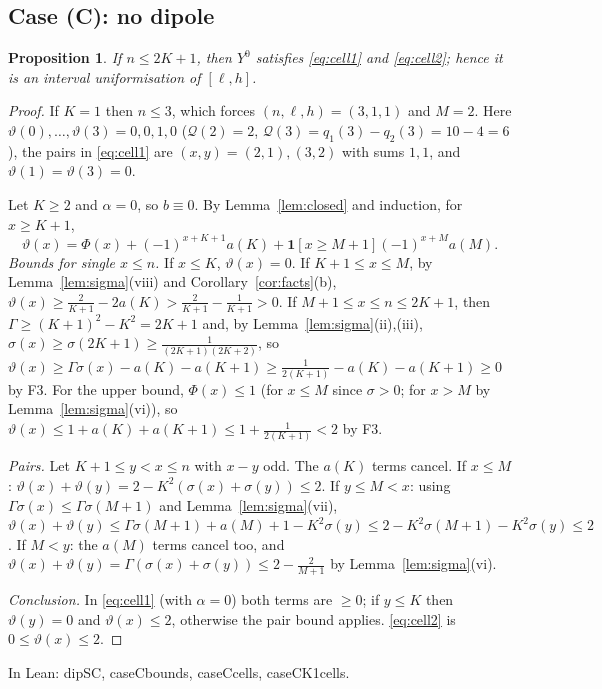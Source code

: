 \documentclass[11pt]{amsart}
\newtheorem{proposition}[lemma]{Proposition}
\theoremstyle{definition}
\theoremstyle{remark}
\numberwithin{equation}{section}
\newcommand{\ind}[1]{\mathbf{1}[#1]}
\newcommand{\cQ}{\mathcal{Q}}
\newcommand{\leanus}{\textunderscore\allowbreak}
\newcommand{\lean}[1]{{\ttfamily\let\_\leanus #1}}
\begin{document}
\subsection{Case (C): no dipole}

\begin{proposition}\label{prop:caseC}
If $n\le2K+1$, then $Y^0$ satisfies \eqref{eq:cell1} and \eqref{eq:cell2}; hence it is an interval
uniformisation of $[\ell,h]$.
\end{proposition}

\begin{proof}
If $K=1$ then $n\le3$, which forces $(n,\ell,h)=(3,1,1)$ and $M=2$. Here
$\vartheta(0),\dots,\vartheta(3)=0,0,1,0$ ($\cQ(2)=2$, $\cQ(3)=q_1(3)-q_2(3)=10-4=6$), the pairs in
\eqref{eq:cell1} are $(x,y)=(2,1),(3,2)$ with sums $1,1$, and $\vartheta(1)=\vartheta(3)=0$.

Let $K\ge2$ and $\alpha=0$, so $b\equiv0$. By Lemma~\ref{lem:closed} and induction, for $x\ge K+1$,
\[
  \vartheta(x)=\Phi(x)+(-1)^{x+K+1}a(K)+\ind{x\ge M+1}(-1)^{x+M}a(M).
\]
\emph{Bounds for single $x\le n$.} If $x\le K$, $\vartheta(x)=0$. If $K+1\le x\le M$, by
Lemma~\ref{lem:sigma}(viii) and Corollary~\ref{cor:facts}(b),
$\vartheta(x)\ge\frac2{K+1}-2a(K)>\frac2{K+1}-\frac1{K+1}>0$. If $M+1\le x\le n\le2K+1$, then
$\Gamma\ge(K+1)^2-K^2=2K+1$ and, by Lemma~\ref{lem:sigma}(ii),(iii),
$\sigma(x)\ge\sigma(2K+1)\ge\frac1{(2K+1)(2K+2)}$, so
$\vartheta(x)\ge\Gamma\sigma(x)-a(K)-a(K+1)\ge\frac1{2(K+1)}-a(K)-a(K+1)\ge0$ by F3. For the upper
bound, $\Phi(x)\le1$ (for $x\le M$ since $\sigma>0$; for $x>M$ by Lemma~\ref{lem:sigma}(vi)), so
$\vartheta(x)\le1+a(K)+a(K+1)\le1+\frac1{2(K+1)}<2$ by F3.

\emph{Pairs.} Let $K+1\le y<x\le n$ with $x-y$ odd. The $a(K)$ terms cancel. If $x\le M$:
$\vartheta(x)+\vartheta(y)=2-K^2(\sigma(x)+\sigma(y))\le2$. If $y\le M<x$: using
$\Gamma\sigma(x)\le\Gamma\sigma(M+1)$ and Lemma~\ref{lem:sigma}(vii),
$\vartheta(x)+\vartheta(y)\le\Gamma\sigma(M+1)+a(M)+1-K^2\sigma(y)\le2-K^2\sigma(M+1)-K^2\sigma(y)\le2$.
If $M<y$: the $a(M)$ terms cancel too, and $\vartheta(x)+\vartheta(y)=\Gamma(\sigma(x)+\sigma(y))\le2-\frac2{M+1}$
by Lemma~\ref{lem:sigma}(vi).

\emph{Conclusion.} In \eqref{eq:cell1} (with $\alpha=0$) both terms are $\ge0$; if $y\le K$ then
$\vartheta(y)=0$ and $\vartheta(x)\le2$, otherwise the pair bound applies. \eqref{eq:cell2} is
$0\le\vartheta(x)\le2$.
\end{proof}

In Lean: \lean{dipS\_C}, \lean{caseC\_bounds}, \lean{caseC\_cells}, \lean{caseC\_K1\_cells}.
\end{document}
